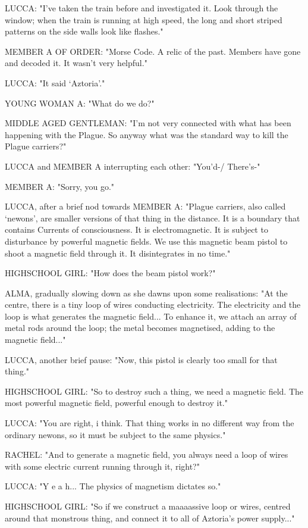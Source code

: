 \documentclass[11pt]{article}
\begin{document}
LUCCA: "I've taken the train before and investigated it.
Look through the window; when the train is running at high speed, the long and short striped patterns on the side walls look like flashes."

MEMBER A OF ORDER: "Morse Code. 
A relic of the past.
Members have gone and decoded it. 
It wasn't very helpful."

LUCCA: "It said `Aztoria'."

YOUNG WOMAN A: "What do we do?"

MIDDLE AGED GENTLEMAN: "I'm not very connected with what has been happening with the Plague. 
So anyway what was the standard way to kill the Plague carriers?"

LUCCA and MEMBER A interrupting each other: "You'd-/ There's-"

MEMBER A: "Sorry, you go."

LUCCA, after a brief nod towards MEMBER A: "Plague carriers, also called `newons', are smaller versions of that thing in the distance. 
It is a boundary that contains Currents of consciousness. 
It is electromagnetic.
It is subject to disturbance by powerful magnetic fields.
We use this magnetic beam pistol to shoot a magnetic field through it.
It disintegrates in no time."

HIGHSCHOOL GIRL: "How does the beam pistol work?"

ALMA, gradually slowing down as she dawns upon some realisations: "At the centre, there is a tiny loop of wires conducting electricity. 
The electricity and the loop is what generates the magnetic field...
To enhance it, we attach an array of metal rods around the loop; the metal becomes magnetised, adding to the magnetic field..."

LUCCA, another brief pause: "Now, this pistol is clearly too small for that thing."

HIGHSCHOOL GIRL: "So to destroy such a thing, we need a magnetic field.
The most powerful magnetic field, powerful enough to destroy it."

LUCCA: "You are right, i think. That thing works in no different way from the ordinary newons, so it must be subject to the same physics."

RACHEL: "And to generate a magnetic field, you always need a loop of wires with some electric current running through it, right?"

LUCCA: "Y e a h... The physics of magnetism dictates so."

HIGHSCHOOL GIRL: "So if we construct a maaaassive loop or wires, centred around that monstrous thing, and connect it to all of Aztoria's power supply..."
\end{document}
